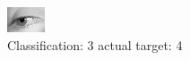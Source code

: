\begin{figure}[h!]
\begin{center}
\includegraphics[width=0.60\columnwidth]{figures/ID2949_class_3_target_4.png}
\end{center}
\caption{ Classification: 3 actual target: 4}
\label{fig:ID2949_class_3_target_4}
\end{figure}
